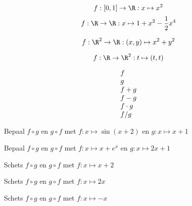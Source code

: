 

 
\hyphenation{}%


\usepackage{pstricks}



\parindent 0mm

\[
f:[0,1]\rightarrow \R:x\mapsto x^2
\]
\[
f:\R \rightarrow \R:x\mapsto 1+x^2-\frac{1}{2}x^4
\]

\[
f:\R^2 \rightarrow \R:(x,y)\mapsto x^2+y^2
\]

\[
f:\R \rightarrow \R^2:t\mapsto (t,t)
\]

\[
\ba{l}
f\\
g\\
f+g\\
f-g\\
f\cdot g\\
f/g
\ea
\]

\vspace{5mm}
\centerline{\hspace{3cm}}
\centerline{\hspace{3cm}}
\centerline{\hspace{3cm}}
\centerline{\hspace{3cm}}
\centerline{\hspace{3cm}}
\centerline{\hspace{3cm}}
\vspace{50mm}



Bepaal $f\circ g$ en $g\circ f$ met $ f:x\mapsto \sin(x+2) $ en $ g:x\mapsto x+1$

Bepaal $f\circ g$ en $g\circ f$ met $ f:x\mapsto x+e^x $ en $ g:x\mapsto 2x+1$

Schets $f\circ g$ en $g\circ f$ met $ f:x\mapsto x+2 $

Schets $f\circ g$ en $g\circ f$ met $ f:x\mapsto 2x $

Schets $f\circ g$ en $g\circ f$ met $ f:x\mapsto -x $

